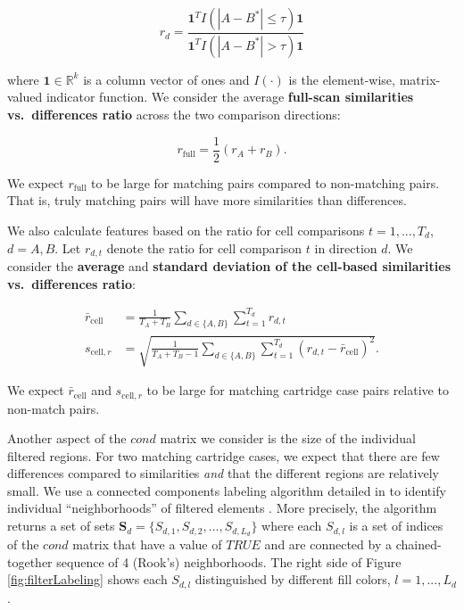 \documentclass[11pt,]{isuthesis}
\begin{document}
\[
r_{d} = \frac{\pmb{1}^T I(|A - B^*| \leq \tau) \pmb{1}}{\pmb{1}^T I(|A - B^*| > \tau) \pmb{1}}
\]

where \(\pmb{1} \in \mathbb{R}^k\) is a column vector of ones and \(I(\cdot)\) is the element-wise, matrix-valued indicator function.
We consider the average \textbf{full-scan similarities vs.~differences ratio} across the two comparison directions:

\[
r_{\text{full}} = \frac{1}{2}(r_A + r_B).
\]

We expect \(r_{\text{full}}\) to be large for matching pairs compared to non-matching pairs.
That is, truly matching pairs will have more similarities than differences.

We also calculate features based on the ratio for cell comparisons \(t = 1,...,T_d\), \(d = A,B\).
Let \(r_{d,t}\) denote the ratio for cell comparison \(t\) in direction \(d\).
We consider the \textbf{average} and \textbf{standard deviation of the cell-based similarities vs.~differences ratio}:

\begin{align*}
\bar{r}_{\text{cell}} &= \frac{1}{T_A + T_B} \sum_{d \in \{A,B\}} \sum_{t = 1}^{T_d} r_{d,t} \\
s_{\text{cell}, r} &= \sqrt{\frac{1}{T_A + T_B - 1} \sum_{d \in \{A,B\}} \sum_{t = 1}^{T_d} (r_{d,t} - \bar{r}_{\text{cell}})^2}.
\end{align*}

We expect \(\bar{r}_{\text{cell}}\) and \(s_{\text{cell}, r}\) to be large for matching cartridge case pairs relative to non-match pairs.

Another aspect of the \(cond\) matrix we consider is the size of the individual filtered regions.
For two matching cartridge cases, we expect that there are few differences compared to similarities \emph{and} that the different regions are relatively small.
We use a connected components labeling algorithm detailed in \citet{hesselink_concurrent_2001} to identify individual ``neighborhoods'' of filtered elements \citep{imager}.
More precisely, the algorithm returns a set of sets \(\pmb{S}_d = \{S_{d,1},S_{d,2},...,S_{d,L_d}\}\) where each \(S_{d,l}\) is a set of indices of the \(cond\) matrix that have a value of \(TRUE\) and are connected by a chained-together sequence of 4 (Rook's) neighborhoods.
The right side of Figure \ref{fig:filterLabeling} shows each \(S_{d,l}\) distinguished by different fill colors, \(l = 1,...,L_d\).
\end{document}

